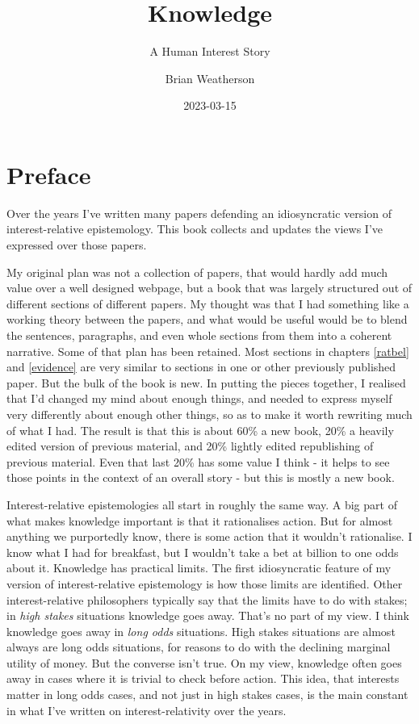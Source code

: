 \documentclass[
  11pt,
]{book}
\title{Knowledge}
\subtitle{A Human Interest Story}
\author{Brian Weatherson}
\date{2023-03-15}
\begin{document}
\maketitle

{
\setcounter{tocdepth}{1}
\tableofcontents
}
\hypertarget{Preface}{%
\chapter*{Preface}\label{Preface}}

\fancyhf{}
\fancyhead[R]{\thepage}

Over the years I've written many papers defending an idiosyncratic version of interest-relative epistemology. This book collects and updates the views I've expressed over those papers.

My original plan was not a collection of papers, that would hardly add much value over a well designed webpage, but a book that was largely structured out of different sections of different papers. My thought was that I had something like a working theory between the papers, and what would be useful would be to blend the sentences, paragraphs, and even whole sections from them into a coherent narrative. Some of that plan has been retained. Most sections in chapters \ref{ratbel} and \ref{evidence} are very similar to sections in one or other previously published paper. But the bulk of the book is new. In putting the pieces together, I realised that I'd changed my mind about enough things, and needed to express myself very differently about enough other things, so as to make it worth rewriting much of what I had. The result is that this is about 60\% a new book, 20\% a heavily edited version of previous material, and 20\% lightly edited republishing of previous material. Even that last 20\% has some value I think - it helps to see those points in the context of an overall story - but this is mostly a new book.

Interest-relative epistemologies all start in roughly the same way. A big part of what makes knowledge important is that it rationalises action. But for almost anything we purportedly know, there is some action that it wouldn't rationalise. I know what I had for breakfast, but I wouldn't take a bet at billion to one odds about it. Knowledge has practical limits. The first idiosyncratic feature of my version of interest-relative epistemology is how those limits are identified. Other interest-relative philosophers typically say that the limits have to do with stakes; in \emph{high stakes} situations knowledge goes away. That's no part of my view. I think knowledge goes away in \emph{long odds} situations. High stakes situations are almost always are long odds situations, for reasons to do with the declining marginal utility of money. But the converse isn't true. On my view, knowledge often goes away in cases where it is trivial to check before action. This idea, that interests matter in long odds cases, and not just in high stakes cases, is the main constant in what I've written on interest-relativity over the years.
\end{document}
